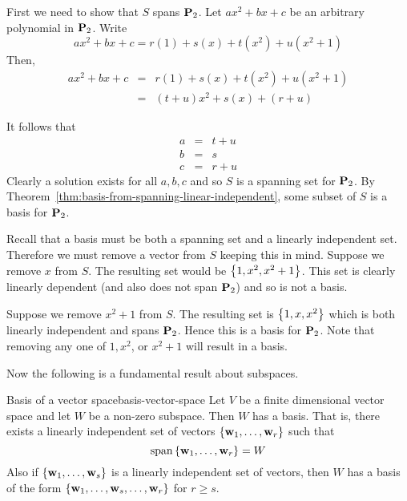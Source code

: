\begin{solution}
  First we need to show that $S$ spans $\mathbf{P}_2$. Let $ax^2 + bx + c$
  be an arbitrary polynomial in $\mathbf{P}_2$. Write
  \begin{equation*}
    ax^2 + bx + c = r(1) + s(x) + t(x^2) + u (x^2 + 1)
  \end{equation*}
  Then,
  \begin{eqnarray*}
    ax^2 +bx + c &=& r(1) + s(x) + t(x^2) + u (x^2 + 1) \\
                 &=& (t+u) x^2 + s(x) + (r+u)
  \end{eqnarray*}

  It follows that
  \begin{eqnarray*}
    a &=& t + u \\
    b &=& s \\
    c &=& r + u
  \end{eqnarray*}
  Clearly a solution exists for all $a,b,c$ and so $S$ is a spanning
  set for $\mathbf{P}_2$. By
  Theorem~\ref{thm:basis-from-spanning-linear-independent}, some
  subset of $S$ is a basis for $\mathbf{P}_2$.

  Recall that a basis must be both a spanning set and a linearly
  independent set.  Therefore we must remove a vector from $S$ keeping
  this in mind. Suppose we remove $x$ from $S$. The resulting set
  would be $\left\{1, x^2, x^2 + 1 \right\}$. This set is clearly linearly
  dependent (and also does not span $\mathbf{P}_2$) and so is not a basis.

  Suppose we remove $x^2 + 1$ from $S$. The resulting set is
  $\left\{1, x, x^2 \right\}$ which is both linearly independent and spans
  $\mathbf{P}_2$. Hence this is a basis for $\mathbf{P}_2$. Note that removing
  any one of $1, x^2$, or $x^2 + 1$ will result in a basis.
\end{solution}

Now the following is a fundamental result about subspaces.

\begin{theorem}{Basis of a vector space}{basis-vector-space}
  Let $V$ be a finite dimensional vector space and let $W$ be a
  non-zero subspace. Then $W$ has a basis. That is, there exists a
  linearly independent set of vectors
  $\left\{\mbox{\bf w}_{1},\ldots,\mbox{\bf w}_{r}\right\} $ such that
  \begin{equation*}
    \sspan\set{\vect{w}_{1},\ldots,\vect{w}_{r}} =W
  \end{equation*}
  Also if $\left\{\mbox{\bf w}_{1},\ldots,\mbox{\bf w}_{s}\right\} $ is a linearly
  independent set of vectors, then $W$ has a basis of the form
  $\left\{\mbox{\bf w} _{1},\ldots,\mbox{\bf w}_{s},\ldots,\mbox{\bf w}_{r}\right\} $ for
  $r\geq s$.
\end{theorem}

